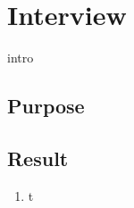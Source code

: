 \section{Interview}

intro

\subsection{Purpose}

\subsection{Result}

\begin{enumerate}
\item t
\end{enumerate}